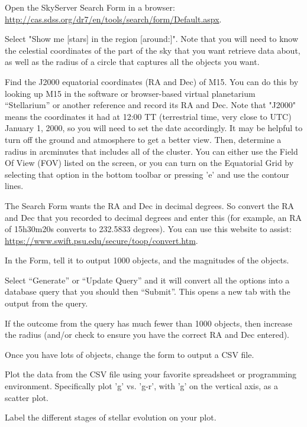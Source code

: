 \begin{steps}
	\item Open the SkyServer Search Form in a browser: \url{http://cas.sdss.org/dr7/en/tools/search/form/Default.aspx}.
	
	\item Select "Show me [stars] in the region [around:]". Note that you will need to know the celestial coordinates of the part of the sky that you want retrieve data about, as well as the radius of a circle that captures all the objects you want.
	
	\item Find the J2000 equatorial coordinates (RA and Dec) of M15. You can do this by looking up M15 in the software or browser-based virtual planetarium ``Stellarium'' or another reference and record its RA and Dec. Note that "J2000" means the coordinates it had at 12:00 TT (terrestrial time, very close to UTC) January 1, 2000, so you will need to set the date accordingly. It may be helpful to turn off the ground and atmosphere to get a better view. Then, determine a radius in arcminutes that includes all of the cluster. You can either use the Field Of View (FOV) listed on the screen, or you can turn on the Equatorial Grid by selecting that option in the bottom toolbar or pressing 'e' and use the contour lines.
	
	\item The Search Form wants the RA and Dec in decimal degrees. So convert the RA and Dec that you recorded to decimal degrees and enter this (for example, an RA of 15h30m20s converts to 232.5833 degrees). You can use this website to assist: \url{https://www.swift.psu.edu/secure/toop/convert.htm}.
	
	\item In the Form, tell it to output 1000 objects, and the magnitudes of the objects.
	
	\item Select ``Generate'' or ``Update Query'' and it will convert all the options into a database query that you should then ``Submit''. This opens a new tab with the output from the query.
	
	\item If the outcome from the query has much fewer than 1000 objects, then increase the radius (and/or check to ensure you have the correct RA and Dec entered).
	
	\item Once you have lots of objects, change the form to output a CSV file.
	
	\item Plot the data from the CSV file using your favorite spreadsheet or programming environment. Specifically plot 'g' vs. 'g-r', with 'g' on the vertical axis, as a scatter plot.

	\item Label the different stages of stellar evolution on your plot.
\end{steps}

